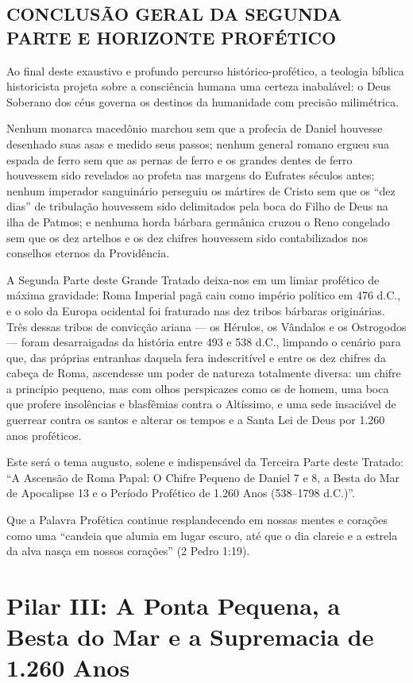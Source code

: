 \documentclass[11pt,a4paper,openany]{book}
\begin{document}
\section{CONCLUSÃO GERAL DA SEGUNDA PARTE E HORIZONTE PROFÉTICO}


Ao final deste exaustivo e profundo percurso histórico-profético, a teologia bíblica historicista projeta sobre a consciência humana uma certeza inabalável: o Deus Soberano dos céus governa os destinos da humanidade com precisão milimétrica.

Nenhum monarca macedônio marchou sem que a profecia de Daniel houvesse desenhado suas asas e medido seus passos; nenhum general romano ergueu sua espada de ferro sem que as pernas de ferro e os grandes dentes de ferro houvessem sido revelados ao profeta nas margens do Eufrates séculos antes; nenhum imperador sanguinário perseguiu os mártires de Cristo sem que os ``dez dias'' de tribulação houvessem sido delimitados pela boca do Filho de Deus na ilha de Patmos; e nenhuma horda bárbara germânica cruzou o Reno congelado sem que os dez artelhos e os dez chifres houvessem sido contabilizados nos conselhos eternos da Providência.

A Segunda Parte deste Grande Tratado deixa-nos em um limiar profético de máxima gravidade:
Roma Imperial pagã caiu como império político em 476 d.C., e o solo da Europa ocidental foi fraturado nas dez tribos bárbaras originárias. Três dessas tribos de convicção ariana — os Hérulos, os Vândalos e os Ostrogodos — foram desarraigadas da história entre 493 e 538 d.C., limpando o cenário para que, das próprias entranhas daquela fera indescritível e entre os dez chifres da cabeça de Roma, ascendesse um poder de natureza totalmente diversa: um chifre a princípio pequeno, mas com olhos perspicazes como os de homem, uma boca que profere insolências e blasfêmias contra o Altíssimo, e uma sede insaciável de guerrear contra os santos e alterar os tempos e a Santa Lei de Deus por 1.260 anos proféticos.

Este será o tema augusto, solene e indispensável da Terceira Parte deste Tratado: ``A Ascensão de Roma Papal: O Chifre Pequeno de Daniel 7 e 8, a Besta do Mar de Apocalipse 13 e o Período Profético de 1.260 Anos (538–1798 d.C.)''.

Que a Palavra Profética continue resplandecendo em nossas mentes e corações como uma ``candeia que alumia em lugar escuro, até que o dia clareie e a estrela da alva nasça em nossos corações'' (2 Pedro 1:19).
\chapter{Pilar III: A Ponta Pequena, a Besta do Mar e a Supremacia de 1.260 Anos}
\end{document}
